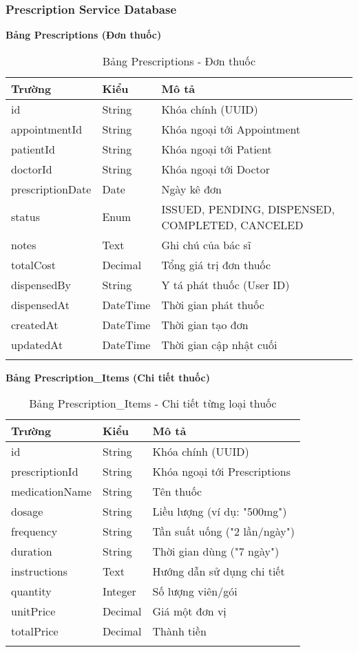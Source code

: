 \documentclass[12pt,a4paper]{report}
\begin{document}
    \subsubsection{Prescription Service Database}
    \textbf{Bảng Prescriptions (Đơn thuốc)}
    \begin{longtable}{|p{3cm}|p{2cm}|p{8cm}|}
    \hline
    \textbf{Trường} & \textbf{Kiểu} & \textbf{Mô tả} \\
    \hline
    id & String & Khóa chính (UUID) \\
    \hline
    appointmentId & String & Khóa ngoại tới Appointment \\
    \hline
    patientId & String & Khóa ngoại tới Patient \\
    \hline
    doctorId & String & Khóa ngoại tới Doctor \\
    \hline
    prescriptionDate & Date & Ngày kê đơn \\
    \hline
    status & Enum & ISSUED, PENDING, DISPENSED, COMPLETED, CANCELED \\
    \hline
    notes & Text & Ghi chú của bác sĩ \\
    \hline
    totalCost & Decimal & Tổng giá trị đơn thuốc \\
    \hline
    dispensedBy & String & Y tá phát thuốc (User ID) \\
    \hline
    dispensedAt & DateTime & Thời gian phát thuốc \\
    \hline
    createdAt & DateTime & Thời gian tạo đơn \\
    \hline
    updatedAt & DateTime & Thời gian cập nhật cuối \\
    \hline
    \caption{Bảng Prescriptions - Đơn thuốc}
    \end{longtable}

    \textbf{Bảng Prescription\_Items (Chi tiết thuốc)}
    \begin{longtable}{|p{3cm}|p{2cm}|p{8cm}|}
    \hline
    \textbf{Trường} & \textbf{Kiểu} & \textbf{Mô tả} \\
    \hline
    id & String & Khóa chính (UUID) \\
    \hline
    prescriptionId & String & Khóa ngoại tới Prescriptions \\
    \hline
    medicationName & String & Tên thuốc \\
    \hline
    dosage & String & Liều lượng (ví dụ: "500mg") \\
    \hline
    frequency & String & Tần suất uống ("2 lần/ngày") \\
    \hline
    duration & String & Thời gian dùng ("7 ngày") \\
    \hline
    instructions & Text & Hướng dẫn sử dụng chi tiết \\
    \hline
    quantity & Integer & Số lượng viên/gói \\
    \hline
    unitPrice & Decimal & Giá một đơn vị \\
    \hline
    totalPrice & Decimal & Thành tiền \\
    \hline
    \caption{Bảng Prescription\_Items - Chi tiết từng loại thuốc}
    \end{longtable}
\end{document}
